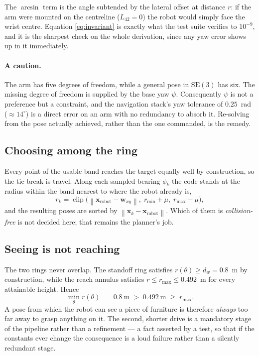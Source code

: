 \documentclass[11pt,a4paper]{article}
\newcommand{\SE}{\mathrm{SE}}
\newcommand{\norm}[1]{\left\lVert #1 \right\rVert}
\begin{document}
The $\arcsin$ term is the angle subtended by the lateral offset at distance $r$:
if the arm were mounted on the centreline ($L_{42}=0$) the robot would simply
face the wrist centre. Equation \eqref{eq:invariant} is exactly what the test
suite verifies to $10^{-9}$, and it is the sharpest check on the whole
derivation, since any yaw error shows up in it immediately.

\paragraph{A caution.} The arm has five degrees of freedom, while a general pose
in $\SE(3)$ has six. The missing degree of freedom is supplied by the base yaw
$\psi$. Consequently $\psi$ is not a preference but a constraint, and the
navigation stack's yaw tolerance of $0.25$~rad ($\approx 14^\circ$) is a direct
error on an arm with no redundancy to absorb it. Re-solving from the pose
actually achieved, rather than the one commanded, is the remedy.

\subsection{Choosing among the ring}

Every point of the usable band reaches the target equally well by construction,
so the tie-break is travel. Along each sampled bearing $\phi_k$ the code stands
at the radius within the band nearest to where the robot already is,
\begin{equation}
r_k = \operatorname{clip}\big(\norm{\mathbf{x}_{\text{robot}} - \mathbf{w}_{xy}},\;
r_{\min}+\mu,\; r_{\max}-\mu\big),
\end{equation}
and the resulting poses are sorted by
$\norm{\mathbf{x}_k - \mathbf{x}_{\text{robot}}}$. Which of them is
\emph{collision-free} is not decided here; that remains the planner's job.

\subsection{Seeing is not reaching}
\label{sec:disjoint}

The two rings never overlap. The standoff ring satisfies
$r(\theta) \ge d_w = 0.8$~m by construction, while the reach annulus satisfies
$r \le r_{\max} \le 0.492$~m for every attainable height. Hence
\begin{equation}
\boxed{\;
\min_\theta r(\theta) \;=\; 0.8\ \text{m} \;>\; 0.492\ \text{m} \;\ge\; r_{\max}.
\;}
\end{equation}
A pose from which the robot can see a piece of furniture is therefore
\emph{always} too far away to grasp anything on it. The second, shorter drive is
a mandatory stage of the pipeline rather than a refinement --- a fact asserted by
a test, so that if the constants ever change the consequence is a loud failure
rather than a silently redundant stage.
\end{document}
